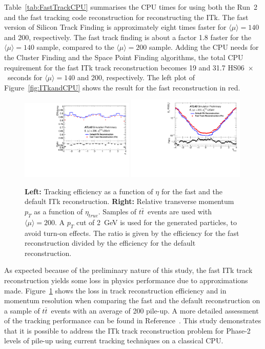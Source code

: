 Table~\ref{tab:FastTrackCPU} summarises the CPU times for using both the Run~2 and the fast tracking code reconstruction for reconstructing the ITk. The fast version of Silicon Track Finding is approximately eight times faster for $\langle\mu\rangle = 140$ and 200, respectively. The fast track finding is about a factor 1.8 faster for the $\langle\mu\rangle = 140$ sample, compared to the $\langle\mu\rangle = 200$ sample. Adding the CPU needs for the Cluster Finding and the Space Point Finding algorithms, the total CPU requirement for the fast ITk track reconstruction becomes 19 and 31.7 HS06~$\times$~seconds for $\langle\mu\rangle = 140$ and 200, respectively. The left plot of Figure~\ref{fig:ITkandCPU} shows the result for the fast reconstruction in red.
%
\begin{figure}[htb!]
  \centering
  \includegraphics[width=0.48\textwidth]{figures/efficiencyEtaCombined}
  \includegraphics[width=0.50\textwidth]{figures/QoPEtaRatio}
  \caption{{\bf Left:} Tracking efficiency as a function of $\eta$ for the fast and the default ITk reconstruction. {\bf Right:} Relative transverse momentum $p_T$ as a function of $\eta_{true}$. Samples of $t\bar{t}$~events are used with $\langle\mu\rangle = 200$. A $p_T$ cut of 2~GeV is used for the generated particles, to avoid turn-on effects. The ratio is given by the efficiency for the fast reconstruction divided by the efficiency for the default reconstruction.}
  \label{fig:FastTrackingPerf}
\end{figure}

As expected because of the preliminary nature of this study, the fast ITk track reconstruction yields some loss in physics performance due to approximations made. Figure~\ref{fig:FastTrackingPerf} shows the loss in track reconstruction efficiency and in momentum resolution when comparing the fast and the default reconstruction on a sample of $t\bar{t}$~events with an average of 200 pile-up. A more detailed assessment of the tracking performance can be found in Reference~\cite{ATL-PHYS-PUB-2019-041}. This study demonstrates that it is possible to address the ITk track reconstruction problem for Phase-2 levels of pile-up using current tracking techniques on a classical CPU.

